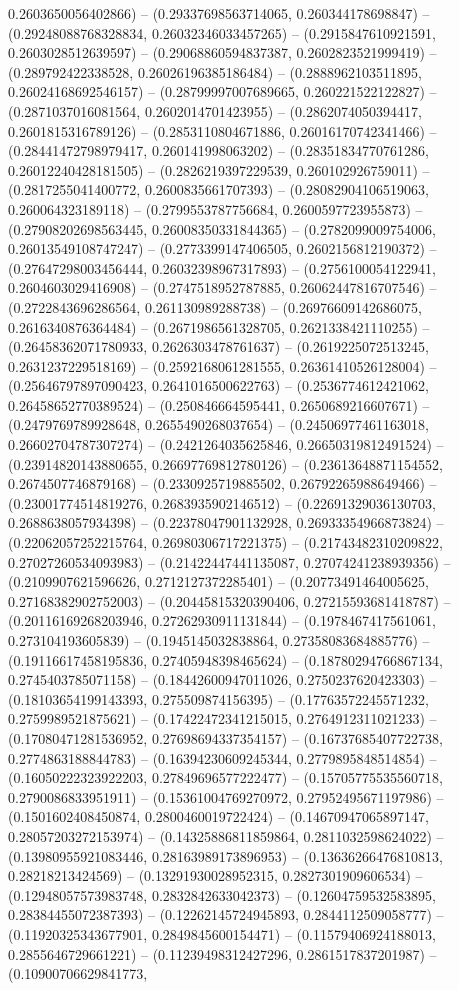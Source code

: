 0.2603650056402866) -- (0.29337698563714065, 0.260344178698847) -- (0.29248088768328834, 0.26032346033457265) -- (0.2915847610921591, 0.2603028512639597) -- (0.29068860594837387, 0.2602823521999419) -- (0.289792422338528, 0.26026196385186484) -- (0.2888962103511895, 0.26024168692546157) -- (0.28799997007689665, 0.260221522122827) -- (0.2871037016081564, 0.2602014701423955) -- (0.2862074050394417, 0.2601815316789126) -- (0.2853110804671886, 0.26016170742341466) -- (0.28441472798979417, 0.260141998063202) -- (0.28351834770761286, 0.26012240428181505) -- (0.2826219397229539, 0.260102926759011) -- (0.2817255041400772, 0.2600835661707393) -- (0.28082904106519063, 0.260064323189118) -- (0.2799553787756684, 0.2600597723955873) -- (0.27908202698563445, 0.26008350331844365) -- (0.2782099009754006, 0.26013549108747247) -- (0.2773399147406505, 0.2602156812190372) -- (0.27647298003456444, 0.26032398967317893) -- (0.2756100054122941, 0.2604603029416908) -- (0.2747518952787885, 0.26062447816707546) -- (0.2722843696286564, 0.261130989288738) -- (0.26976609142686075, 0.2616340876364484) -- (0.2671986561328705, 0.2621338421110255) -- (0.26458362071780933, 0.2626303478761637) -- (0.2619225072513245, 0.2631237229518169) -- (0.2592168061281555, 0.26361410526128004) -- (0.25646797897090423, 0.2641016500622763) -- (0.2536774612421062, 0.26458652770389524) -- (0.250846664595441, 0.2650689216607671) -- (0.2479769789928648, 0.2655490268037654) -- (0.24506977461163018, 0.26602704787307274) -- (0.2421264035625846, 0.26650319812491524) -- (0.23914820143880655, 0.26697769812780126) -- (0.23613648871154552, 0.2674507746879168) -- (0.2330925719885502, 0.26792265988649466) -- (0.23001774514819276, 0.2683935902146512) -- (0.22691329036130703, 0.2688638057934398) -- (0.22378047901132928, 0.26933354966873824) -- (0.22062057252215764, 0.26980306717221375) -- (0.21743482310209822, 0.27027260534093983) -- (0.21422447441135087, 0.27074241238939356) -- (0.2109907621596626, 0.2712127372285401) -- (0.20773491464005625, 0.27168382902752003) -- (0.20445815320390406, 0.27215593681418787) -- (0.20116169268203946, 0.27262930911131844) -- (0.1978467417561061, 0.273104193605839) -- (0.1945145032838864, 0.27358083684885776) -- (0.19116617458195836, 0.27405948398465624) -- (0.18780294766867134, 0.2745403785071158) -- (0.18442600947011026, 0.2750237620423303) -- (0.18103654199143393, 0.275509874156395) -- (0.17763572245571232, 0.2759989521875621) -- (0.17422472341215015, 0.2764912311021233) -- (0.17080471281536952, 0.27698694337354157) -- (0.16737685407722738, 0.2774863188844783) -- (0.16394230609245344, 0.2779895848514854) -- (0.16050222323922203, 0.27849696577222477) -- (0.15705775535560718, 0.2790086833951911) -- (0.15361004769270972, 0.27952495671197986) -- (0.1501602408450874, 0.2800460019722424) -- (0.14670947065897147, 0.28057203272153974) -- (0.14325886811859864, 0.2811032598624022) -- (0.13980955921083446, 0.28163989173896953) -- (0.13636266476810813, 0.28218213424569) -- (0.13291930028952315, 0.2827301909606534) -- (0.12948057573983748, 0.2832842633042373) -- (0.12604759532583895, 0.28384455072387393) -- (0.12262145724945893, 0.2844112509058777) -- (0.11920325343677901, 0.2849845600154471) -- (0.11579406924188013, 0.2855646729661221) -- (0.11239498312427296, 0.2861517837201987) -- (0.10900706629841773, 